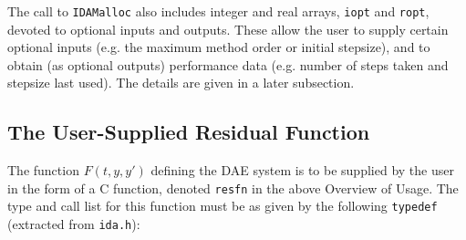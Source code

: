 \vspace{.2 in}

The call to {\tt IDAMalloc} also includes integer and real arrays, 
{\tt iopt} and {\tt ropt}, devoted to optional inputs and outputs.
These allow the user to supply certain optional inputs (e.g. the
maximum method order or initial stepsize), and to obtain (as optional
outputs) performance data (e.g. number of steps taken and stepsize
last used).  The details are given in a later subsection.


\subsection{The User-Supplied Residual Function}

The function $F(t,y,y')$ defining the DAE system is to be supplied by
the user in the form of a C function, denoted {\tt resfn} in the above
Overview of Usage.  The type and call list for this function must be
as given by the following {\tt typedef} (extracted from {\tt ida.h}):

\newpage

